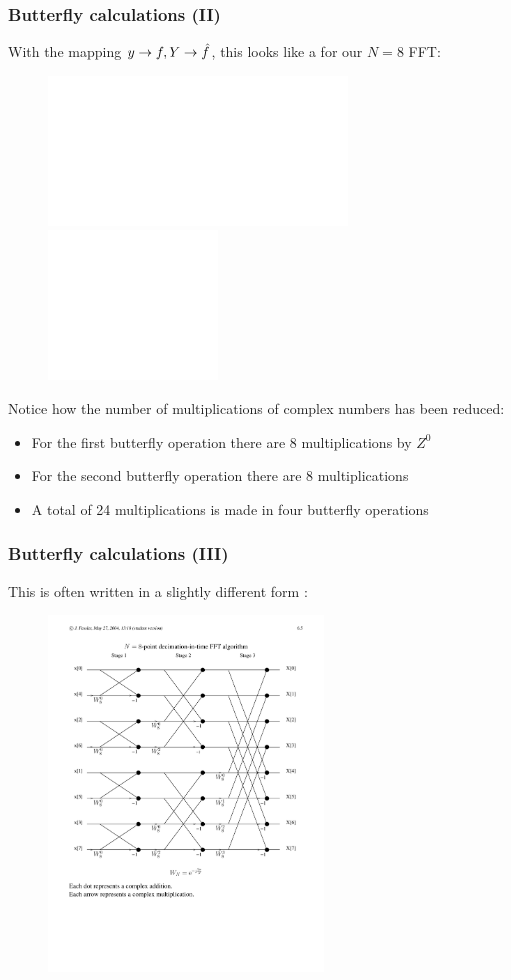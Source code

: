 \documentclass[hyperref={colorlinks=true}]{beamer}
\begin{document}
\begin{frame}%
  \frametitle{Butterfly calculations (II)}
  
  With the mapping $y \rightarrow f, Y \rightarrow \hat{f}$, this looks like a  for our $N=8$ FFT:
  \begin{figure}
    \includegraphics<1>[width=\textwidth]{ButterflyOperations.pdf}
    \includegraphics<2>[width=0.4\textwidth]{ButterflyOperations.pdf}
  \end{figure}
  
  \pause
  
  Notice how the number of multiplications of complex numbers has been reduced: 
  \begin{itemize}
    \item For the first butterfly operation there are 8 multiplications by $Z^0$
    \item For the second butterfly operation there are 8 multiplications
    \item A total of 24 multiplications is made in four butterfly operations
  \end{itemize}
  
\end{frame}  

  
\begin{frame}%
  \frametitle{Butterfly calculations (III)}
  
  This is often written in a slightly different form :
  \begin{figure}
    \includegraphics[width=0.65\textwidth]{DITFFT.pdf}
  \end{figure}
 
  
\end{frame}  
\end{document}

